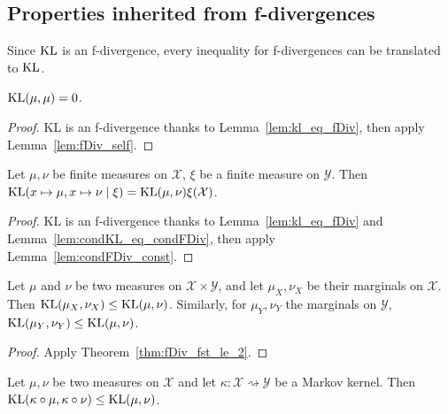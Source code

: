 \subsection{Properties inherited from f-divergences}

Since $\operatorname{KL}$ is an f-divergence, every inequality for f-divergences can be translated to $\operatorname{KL}$.

\begin{lemma}
  \label{lem:kl_self}
  \leanok
  $\operatorname{KL}(\mu, \mu) = 0$.
\end{lemma}

\begin{proof} \leanok
  KL is an f-divergence thanks to Lemma~\ref{lem:kl_eq_fDiv}, then apply Lemma~\ref{lem:fDiv_self}.
\end{proof}

\begin{lemma}
  \label{lem:condKL_const}
  \leanok
  Let $\mu, \nu$ be finite measures on $\mathcal X$, $\xi$ be a finite measure on $\mathcal Y$. 
  Then $\operatorname{KL}(x \mapsto \mu, x \mapsto \nu \mid \xi) = \operatorname{KL}(\mu, \nu) \xi (\mathcal X)$.
\end{lemma}

\begin{proof} \leanok
  KL is an f-divergence thanks to Lemma~\ref{lem:kl_eq_fDiv} and Lemma~\ref{lem:condKL_eq_condFDiv}, then apply Lemma~\ref{lem:condFDiv_const}.
\end{proof}

\begin{theorem}[Marginals]
  \label{thm:kl_fst_le}
  \leanok
  Let $\mu$ and $\nu$ be two measures on $\mathcal X \times \mathcal Y$, and let $\mu_X, \nu_X$ be their marginals on $\mathcal X$.
  Then $\operatorname{KL}(\mu_X, \nu_X) \le \operatorname{KL}(\mu, \nu)$.
  Similarly, for $\mu_Y, \nu_Y$ the marginals on $\mathcal Y$, $\operatorname{KL}(\mu_Y, \nu_Y) \le \operatorname{KL}(\mu, \nu)$.
\end{theorem}

\begin{proof} \leanok
{}
Apply Theorem~\ref{thm:fDiv_fst_le_2}.
\end{proof}

\begin{theorem}
  \label{thm:kl_data_proc}
  \leanok
  Let $\mu, \nu$ be two measures on $\mathcal X$ and let $\kappa : \mathcal X \rightsquigarrow \mathcal Y$ be a Markov kernel.
  Then $\operatorname{KL}(\kappa \circ \mu, \kappa \circ \nu) \le \operatorname{KL}(\mu, \nu)$.
\end{theorem}

